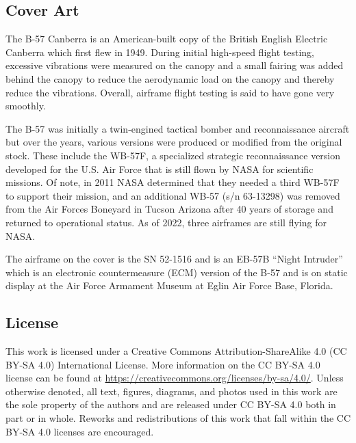 \documentclass[12pt,letter]{article}
\begin{document}







\subsection{Cover Art}
The B-57 Canberra is an American-built copy of the British English Electric Canberra which first flew in 1949. During initial high-speed flight testing, excessive vibrations were measured on the canopy and a small fairing was added behind the canopy to reduce the aerodynamic load on the canopy and thereby reduce the vibrations. Overall, airframe flight testing is said to have gone very smoothly. 

The B-57 was initially a twin-engined tactical bomber and reconnaissance aircraft but over the years, various versions were produced or modified from the original stock. These include the WB-57F, a specialized strategic reconnaissance version developed for the U.S. Air Force that is still flown by NASA for scientific missions. Of note, in 2011 NASA determined that they needed a third WB-57F to support their mission, and an additional WB-57 (s/n 63-13298) was removed from the Air Forces Boneyard in Tucson Arizona after 40 years of storage and returned to operational status. As of 2022, three airframes are still flying for NASA.

The airframe on the cover is the SN 52-1516 and is an EB-57B ``Night Intruder'' which is an electronic countermeasure (ECM) version of the B-57 and is on static display at the Air Force Armament Museum at Eglin Air Force Base, Florida. 

\pagebreak

\subsection{License}
This work is licensed under a Creative Commons Attribution-ShareAlike 4.0 (CC BY-SA 4.0) International License. More information on the CC BY-SA 4.0 license can be found at  \url{https://creativecommons.org/licenses/by-sa/4.0/}. Unless otherwise denoted, all text, figures, diagrams, and photos used in this work are the sole property of the authors and are released under CC BY-SA 4.0 both in part or in whole. Reworks and redistributions of this work that fall within the CC BY-SA 4.0 licenses are encouraged.
\end{document}
